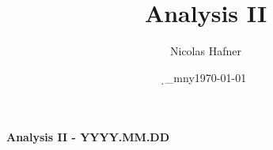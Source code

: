 \documentclass[12pt,a4paper,titlepage]{article}
\author{Nicolas Hafner}
\title{Analysis II}
\date{\d_mny\today}
\begin{document}
	
\begin{center}{\bfseries\Huge Analysis II - YYYY.MM.DD}\end{center}
\end{document}
